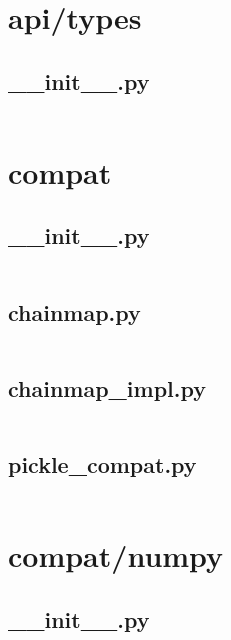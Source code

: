 \documentclass{article}
\begin{document}
\section{api/types}

\subsection{\_\_init\_\_.py}
\inputminted{python}{/home/dufferzafar/dev/@clones/pandas/pandas/api/types/__init__.py}
\newpage

\section{compat}

\subsection{\_\_init\_\_.py}
\inputminted{python}{/home/dufferzafar/dev/@clones/pandas/pandas/compat/__init__.py}
\newpage

\subsection{chainmap.py}
\inputminted{python}{/home/dufferzafar/dev/@clones/pandas/pandas/compat/chainmap.py}
\newpage

\subsection{chainmap\_impl.py}
\inputminted{python}{/home/dufferzafar/dev/@clones/pandas/pandas/compat/chainmap_impl.py}
\newpage

\subsection{pickle\_compat.py}
\inputminted{python}{/home/dufferzafar/dev/@clones/pandas/pandas/compat/pickle_compat.py}
\newpage

\section{compat/numpy}

\subsection{\_\_init\_\_.py}
\inputminted{python}{/home/dufferzafar/dev/@clones/pandas/pandas/compat/numpy/__init__.py}
\newpage
\end{document}
